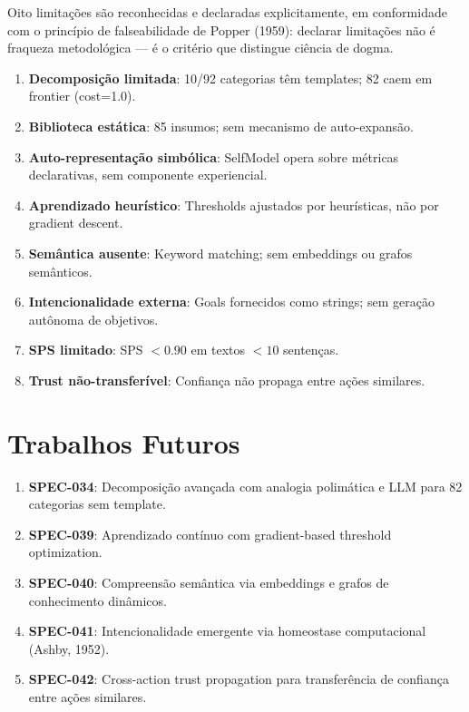 Oito limitações são reconhecidas e declaradas explicitamente, em conformidade com o princípio de falseabilidade de Popper (1959): declarar limitações não é fraqueza metodológica — é o critério que distingue ciência de dogma.

\begin{enumerate}
    \item \textbf{Decomposição limitada}: 10/92 categorias têm templates; 82 caem em frontier (cost=1.0).
    \item \textbf{Biblioteca estática}: 85 insumos; sem mecanismo de auto-expansão.
    \item \textbf{Auto-representação simbólica}: SelfModel opera sobre métricas declarativas, sem componente experiencial.
    \item \textbf{Aprendizado heurístico}: Thresholds ajustados por heurísticas, não por gradient descent.
    \item \textbf{Semântica ausente}: Keyword matching; sem embeddings ou grafos semânticos.
    \item \textbf{Intencionalidade externa}: Goals fornecidos como strings; sem geração autônoma de objetivos.
    \item \textbf{SPS limitado}: SPS $< 0.90$ em textos $< 10$ sentenças.
    \item \textbf{Trust não-transferível}: Confiança não propaga entre ações similares.
\end{enumerate}

\section{Trabalhos Futuros}

\begin{enumerate}
    \item \textbf{SPEC-034}: Decomposição avançada com analogia polimática e LLM para 82 categorias sem template.
    \item \textbf{SPEC-039}: Aprendizado contínuo com gradient-based threshold optimization.
    \item \textbf{SPEC-040}: Compreensão semântica via embeddings e grafos de conhecimento dinâmicos.
    \item \textbf{SPEC-041}: Intencionalidade emergente via homeostase computacional (Ashby, 1952).
    \item \textbf{SPEC-042}: Cross-action trust propagation para transferência de confiança entre ações similares.
\end{enumerate}
